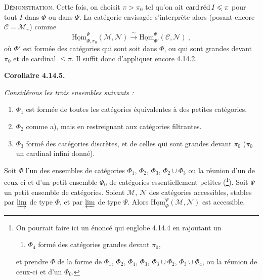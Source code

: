 \documentclass[11pt]{article}
\newcommand{\msp}[1]{\marginpar{\footnotesize [#1]}}
\newcommand{\cardred}{\mathop{\textup{card\,réd}}\nolimits}
\newcommand{\uHom}{\underline{\mathrm{Hom}}}
\begin{document}
\noindent\textsc{Démonstration}. Cette fois, on choisit $\pi>\pi_0$ tel qu'on ait $\cardred I\leqslant\pi$ pour tout $I$ dans $\Phi$ ou dans $\Psi$. La catégorie envisagée s'interprète alors (posant encore $\mathcal{C}=\mathcal{M}_\pi$) comme
\msp{page 375}
\[
\uHom^{\Psi}_{\Phi,\pi_0}(\mathcal{M},\mathcal{N}) \xrightarrow{\ \sim\ } \uHom^{\Psi}_{\Phi'}(\mathcal{C},\mathcal{N})\ ,
\]
où $\Phi'$ est formée des catégories qui sont soit dans $\Phi$, ou qui sont grandes devant $\pi_0$ et de cardinal $\leqslant\pi$. Il suffit donc d'appliquer encore 4.14.2.

\noindent\textbf{Corollaire 4.14.5.} {\itshape Considérons les trois ensembles suivants :
\begin{enumerate}[leftmargin=2.5em]
\item[\textit{a)}] $\Phi_1$ est formée de toutes les catégories équivalentes à des petites catégories.
\item[\textit{b)}] $\Phi_2$ comme a), mais en restreignant aux catégories filtrantes.
\item[\textit{c)}] $\Phi_3$ formé des catégories discrètes, et de celles qui sont grandes devant $\pi_0$ ($\pi_0$ un cardinal infini donné).
\end{enumerate}
\noindent Soit $\Phi$ l'un des ensembles de catégories $\Phi_1$, $\Phi_2$, $\Phi_3$, $\Phi_2\cup\Phi_3$ ou la réunion d'un de ceux-ci et d'un petit ensemble $\Phi_0$ de catégories essentiellement petites (\footnote[165]{On pourrait faire ici un énoncé qui englobe 4.14.4 en rajoutant un
\begin{enumerate}[leftmargin=2.5em]
\item[d)] $\Phi_4$ formé des catégories grandes devant $\pi_0$,
\end{enumerate}
\noindent et prendre $\Phi$ de la forme de $\Phi_1$, $\Phi_2$, $\Phi_4$, $\Phi_3$, $\Phi_3\cup\Phi_2$, $\Phi_3\cup\Phi_4$, ou la réunion de ceux-ci et d'un $\Phi_0$.}). Soit $\Psi$ un petit ensemble de catégories. Soient $\mathcal{M}$, $\mathcal{N}$ des catégories accessibles, stables par $\varinjlim$ de type $\Phi$, et par $\varprojlim$ de type $\Psi$. Alors $\uHom^{\Psi}_{\Phi}(\mathcal{M},\mathcal{N})$ est accessible.}

\msp{page 376}
\end{document}
